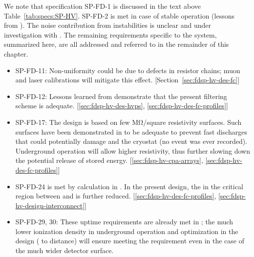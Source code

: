 
We note that specification SP-FD-1 is discussed in the text above Table~\ref{tab:specs:SP-HV}. SP-FD-2  is met in case of stable  operation (lessons from ). The noise contribution from  instabilities is unclear and under investigation with . The remaining requirements specific to the  system, summarized here, are all addressed and referred to in the remainder of this chapter. 


\begin{itemize}
\item SP-FD-11: Non-uniformity could be due to defects in resistor chains; muon and laser calibrations will mitigate this effect. [Section~\ref{sec:fdsp-hv-des-fc}] %
\item SP-FD-12: Lessons learned from  demonstrate that the present filtering scheme is adequate. [\ref{sec:fdsp-hv-des-hvps}, \ref{sec:fdsp-hv-des-fc-profiles}] %
\item SP-FD-17: The  design is based on few \si{\mega\ohm}/square resistivity surfaces. Such surfaces have been demonstrated in  to be adequate to prevent fast discharges that could potentially damage  and the cryostat (no event was ever recorded). Underground operation will allow higher resistivity, thus further slowing down the potential release of stored energy. [\ref{sec:fdsp-hv-cpa-arrays}, \ref{sec:fdsp-hv-des-fc-profiles}] %
\item SP-FD-24 is met by calculation in . In the present design, the \efield in the critical region between  and  is further reduced. [\ref{sec:fdsp-hv-des-fc-profiles}, \ref{sec:fdsp-hv-design-interconnect}] %
\item SP-FD-29, 30: These uptime requirements are already met in ; the much lower ionization density in underground operation and optimization in the design ( to  distance) will ensure meeting the requirement even in the case of the much wider detector surface. 

\end{itemize}
